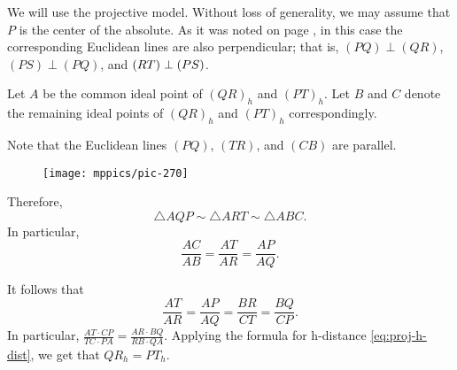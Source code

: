 We will use the projective model.
Without loss of generality, we may assume that $P$ is the center of the absolute.
As it was noted on page \pageref{klein-angles},
in this case the corresponding Euclidean lines are also perpendicular;
that is, $(PQ)\perp (QR)$, $(PS)\perp(PQ)$, and $(RT)\z\perp (PS)$.

Let $A$ be the common ideal point of $(QR)_h$ and $(PT)_h$.
Let $B$ and $C$ denote the remaining ideal points of $(QR)_h$ and $(PT)_h$
correspondingly.

Note that the Euclidean lines $(PQ)$, $(TR)$, and $(CB)$ are parallel.

\begin{wrapfigure}{o}{55mm}
\vskip-2mm
\centering
\texttt{[image: mppics/pic-270]}
\vskip2mm
\end{wrapfigure}

Therefore, 
\[\triangle AQP\sim \triangle ART \sim\triangle ABC.\]
In particular,
\[\frac{AC}{AB}=\frac{AT}{AR}=\frac{AP}{AQ}.\]

It follows that
\[\frac{AT}{AR}=\frac{AP}{AQ}=\frac{BR}{CT}=\frac{BQ}{CP}.\]
In particular, $\tfrac{AT\cdot CP}{TC\cdot PA}=\tfrac{AR\cdot BQ}{RB\cdot QA}$.
Applying the formula for h-distance \ref{eq:proj-h-dist}, we get that $QR_h=PT_h$.
\qeds
 

